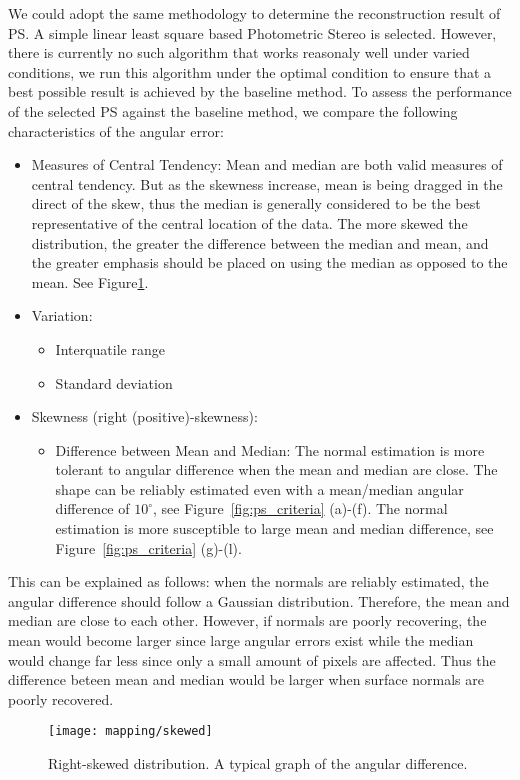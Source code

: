 We could adopt the same methodology to determine the reconstruction result of PS. A simple linear least square based Photometric Stereo is selected. However, there is currently no such algorithm that works reasonaly well under varied conditions, we run this algorithm under the optimal condition to ensure that a best possible result is achieved by the baseline method. To assess the performance of the selected PS against the baseline method, we compare the following characteristics of the angular error:
\begin{itemize}
\item Measures of Central Tendency: Mean and median are both valid measures of central tendency. But as the skewness increase, mean is being dragged in the direct of the skew, thus the median is generally considered to be the best representative of the central location of the data. The more skewed the distribution, the greater the difference between the median and mean, and the greater emphasis should be placed on using the median as opposed to the mean. See Figure\ref{fig:ang_diff_skew}.
\item Variation:
  \begin{itemize}
    \item Interquatile range%
    \item Standard deviation%
  \end{itemize}
\item Skewness (right (positive)-skewness):
  \begin{itemize}
    \item Difference between Mean and Median: The normal estimation is more tolerant to angular difference when the mean and median are close. The shape can be reliably estimated even with a mean/median angular difference of $10^\circ$, see Figure~\ref{fig:ps_criteria} (a)-(f). The normal estimation is more susceptible to large mean and median difference, see Figure~\ref{fig:ps_criteria} (g)-(l).
  \end{itemize}
\end{itemize}
This can be explained as follows: when the normals are reliably estimated, the angular difference should follow a Gaussian distribution. Therefore, the mean and median are close to each other. However, if normals are poorly recovering, the mean would become larger since large angular errors exist while the median would change far less since only a small amount of pixels are affected. Thus the difference beteen mean and median would be larger when surface normals are poorly recovered.
\begin{figure}[!htbp]
\centering
\texttt{[image: mapping/skewed]}
\caption{Right-skewed distribution. A typical graph of the angular difference.}
\label{fig:ang_diff_skew}
\end{figure}


